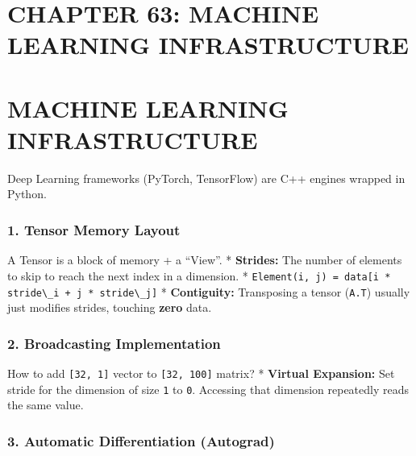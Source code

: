 \hypertarget{chapter-63-machine-learning-infrastructure}{%
\section{CHAPTER 63: MACHINE LEARNING
INFRASTRUCTURE}\label{chapter-63-machine-learning-infrastructure}}

\hypertarget{machine-learning-infrastructure}{%
\section{MACHINE LEARNING
INFRASTRUCTURE}\label{machine-learning-infrastructure}}

Deep Learning frameworks (PyTorch, TensorFlow) are C++ engines wrapped
in Python.

\hypertarget{tensor-memory-layout}{%
\subsubsection{1. Tensor Memory Layout}\label{tensor-memory-layout}}

A Tensor is a block of memory + a ``View''. * \textbf{Strides:} The
number of elements to skip to reach the next index in a dimension. *
\passthrough{\lstinline!Element(i, j) = data[i * stride\_i + j * stride\_j]!}
* \textbf{Contiguity:} Transposing a tensor
(\passthrough{\lstinline!A.T!}) usually just modifies strides, touching
\textbf{zero} data.

\hypertarget{broadcasting-implementation}{%
\subsubsection{2. Broadcasting
Implementation}\label{broadcasting-implementation}}

How to add \passthrough{\lstinline![32, 1]!} vector to
\passthrough{\lstinline![32, 100]!} matrix? * \textbf{Virtual
Expansion:} Set stride for the dimension of size
\passthrough{\lstinline!1!} to \passthrough{\lstinline!0!}. Accessing
that dimension repeatedly reads the same value.

\hypertarget{automatic-differentiation-autograd}{%
\subsubsection{3. Automatic Differentiation
(Autograd)}\label{automatic-differentiation-autograd}}

